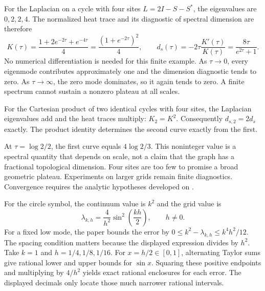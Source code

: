 For the Laplacian on a cycle with four sites $L=2I-S-S^*$, the eigenvalues are $0,2,2,4$. The normalized heat trace and its diagnostic of spectral dimension are therefore
\[
K(\tau)=\frac{1+2e^{-2\tau}+e^{-4\tau}}4
=\frac{(1+e^{-2\tau})^2}4,
\qquad
 d_s(\tau)=-2\tau\frac{K'(\tau)}{K(\tau)}
=\frac{8\tau}{e^{2\tau}+1}.
\]
No numerical differentiation is needed for this finite example.
As $\tau\to0$, every eigenmode contributes approximately one and the dimension diagnostic tends to zero. As $\tau\to\infty$, the zero mode dominates, so it again tends to zero. A finite spectrum cannot sustain a nonzero plateau at all scales.

For the Cartesian product of two identical cycles with four sites, the Laplacian eigenvalues add and the heat traces multiply: $K_2=K^2$. Consequently $d_{s,2}=2d_s$ exactly. The product identity determines the second curve exactly from the first.

At $\tau=\log2/2$, the first curve equals $4\log2/3$. This noninteger value is a spectral quantity that depends on scale, not a claim that the graph has a fractional topological dimension. Four sites are too few to promise a broad geometric plateau. Experiments on larger grids remain finite diagnostics. Convergence requires the analytic hypotheses developed on .

For the circle symbol, the continuum value is $k^2$ and the grid value is
\[
\lambda_{k,h}=\frac4{h^2}\sin^2\!\left(\frac{kh}{2}\right),\qquad h\ne0.
\]
For a fixed low mode, the paper bounds the error by $0\le k^2-\lambda_{k,h}\le k^4h^2/12$. The spacing condition matters because the displayed expression divides by $h^2$.
Take $k=1$ and $h=1/4,1/8,1/16$. For $x=h/2\in[0,1]$, alternating Taylor sums give rational lower and upper bounds for $\sin x$. Squaring these positive endpoints and multiplying by $4/h^2$ yields exact rational enclosures for each error. The displayed decimals only locate those much narrower rational intervals.

